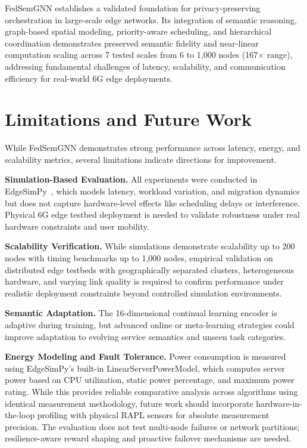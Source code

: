 \documentclass[conference]{IEEEtran}
\begin{document}
	\textcolor{revblue}{FedSemGNN establishes a validated foundation for privacy-preserving orchestration in large-scale edge networks. Its integration of semantic reasoning, graph-based spatial modeling, priority-aware scheduling, and hierarchical coordination demonstrates preserved semantic fidelity and near-linear computation scaling across 7 tested scales from 6 to 1{,}000 nodes (167$\times$ range), addressing fundamental challenges of latency, scalability, and communication efficiency for real-world 6G edge deployments.}
	
	
	\section{Limitations and Future Work}
	\label{sec:limitations_future}
	
	While FedSemGNN demonstrates strong performance across latency, energy, and scalability metrics, several limitations indicate directions for improvement.
	
	\textbf{Simulation-Based Evaluation.} All experiments were conducted in EdgeSimPy~\cite{souza2023edgesimpy}, which models latency, workload variation, and migration dynamics but does not capture hardware-level effects like scheduling delays or interference. Physical 6G edge testbed deployment is needed to validate robustness under real hardware constraints and user mobility.
	
	\textcolor{revblue}{\textbf{Scalability Verification.} While simulations demonstrate scalability up to 200 nodes with timing benchmarks up to 1{,}000 nodes, empirical validation on distributed edge testbeds with geographically separated clusters, heterogeneous hardware, and varying link quality is required to confirm performance under realistic deployment constraints beyond controlled simulation environments.}
	
	\textbf{Semantic Adaptation.} The 16-dimensional continual learning encoder is adaptive during training, but advanced online or meta-learning strategies could improve adaptation to evolving service semantics and unseen task categories.
	
	\textcolor{revblue}{\textbf{Energy Modeling and Fault Tolerance.} Power consumption is measured using EdgeSimPy's built-in LinearServerPowerModel, which computes server power based on CPU utilization, static power percentage, and maximum power rating. While this provides reliable comparative analysis across algorithms using identical measurement methodology, future work should incorporate hardware-in-the-loop profiling with physical RAPL sensors for absolute measurement precision. The evaluation does not test multi-node failures or network partitions; resilience-aware reward shaping and proactive failover mechanisms are needed.}
	
\end{document}
